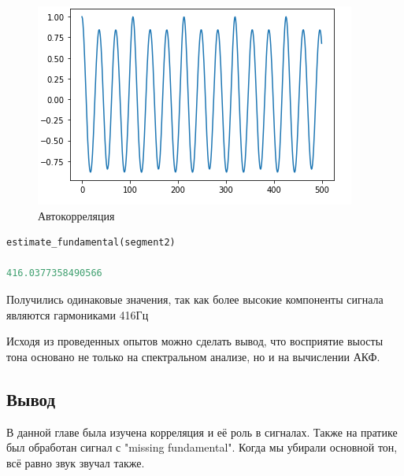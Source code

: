 \begin{figure}[H]
	\begin{center}
		\includegraphics[scale=1]{fig/lab05/lab05_14.png}
		\caption{Автокорреляция}
	\end{center}
\end{figure}

\begin{lstlisting}[language=Python]
estimate_fundamental(segment2)

416.0377358490566
\end{lstlisting}

Получились одинаковые значения, так как более высокие компоненты сигнала являются гармониками 416Гц

Исходя из проведенных опытов можно сделать вывод, что восприятие выосты тона основано не только на спектральном анализе, но и на вычислении АКФ.


\subsection{Вывод}

В данной главе была изучена корреляция и её роль в сигналах. Также на пратике был обработан сигнал с "missing fundamental". Когда мы убирали основной тон, всё равно звук звучал также.